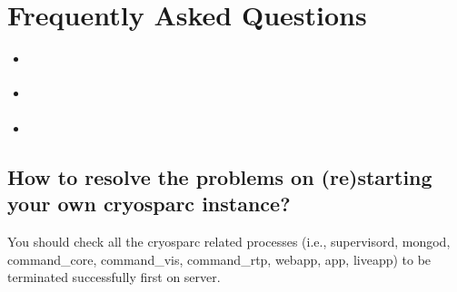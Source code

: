 \documentclass[a4paper,11pt,english]{sphinxmanual}
\begin{document}
\sphinxstepscope


\chapter{Frequently Asked Questions}
\label{\detokenize{faq:frequently-asked-questions}}\label{\detokenize{faq::doc}}\begin{itemize}
\item {} 
\sphinxAtStartPar
{\hyperref[\detokenize{faq:how-to-resolve-the-problems-on-re-starting-your-own-cryosparc-instance}]{}}

\item {} 
\sphinxAtStartPar
{\hyperref[\detokenize{faq:how-to-repair-cryosparc-database-corruption-caused-by-duplicated-mongod-executions}]{}}

\item {} 
\sphinxAtStartPar
{\hyperref[\detokenize{faq:how-to-update-cryosparc-softwares}]{}}

\end{itemize}


\section{How to resolve the problems on (re)starting your own cryosparc instance?}
\label{\detokenize{faq:how-to-resolve-the-problems-on-re-starting-your-own-cryosparc-instance}}\label{\detokenize{faq:id1}}
\sphinxAtStartPar
You should check all the cryosparc related processes (i.e., supervisord, mongod, command\_core, command\_vis, command\_rtp, webapp, app, liveapp) to be terminated successfully first on  server.
\end{document}
